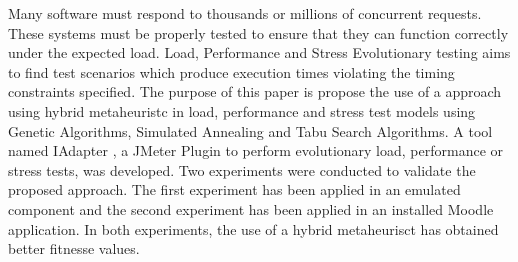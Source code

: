Many software must respond to  thousands or millions of concurrent requests. 
These systems must be properly tested to ensure that they can function correctly under the expected load.  
Load, Performance and Stress Evolutionary testing aims to find test scenarios which produce execution times violating the timing constraints specified. 
The purpose of this paper is propose the use of a approach using  hybrid metaheuristc  in load, performance and stress test models  using Genetic Algorithms, Simulated Annealing and Tabu Search Algorithms. A tool named IAdapter ,  a JMeter Plugin to perform evolutionary load, performance or stress tests, was developed. Two experiments were conducted to validate the proposed approach. The first experiment has been applied in an emulated component and the second experiment has been applied in an installed Moodle application.  In both experiments,  the use of a hybrid metaheurisct  has obtained better fitnesse values.
%
% 
%

%
%

